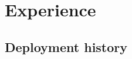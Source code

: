 \documentclass[letterpaper,twocolumn]{article}
\begin{document}

\section{Experience}
\label{sec:experience}

\subsection{Deployment history}
\end{document}
